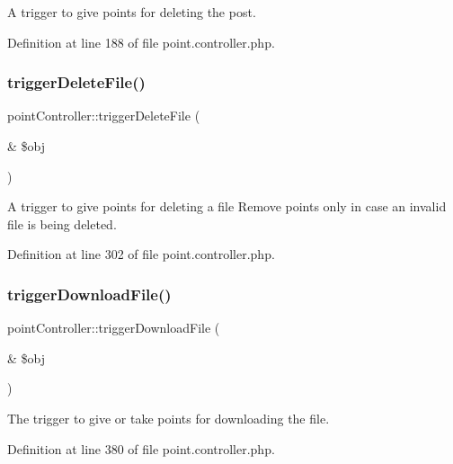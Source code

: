 A trigger to give points for deleting the post. 



Definition at line 188 of file point.\+controller.\+php.

\mbox{\label{classpointController_a1d303c7b8ada6f84e53b5d32336bc313}} 
\subsubsection{\texorpdfstring{trigger\+Delete\+File()}{triggerDeleteFile()}}
{\footnotesize\ttfamily point\+Controller\+::trigger\+Delete\+File (\begin{DoxyParamCaption}\item[{\&}]{\$obj }\end{DoxyParamCaption})}



A trigger to give points for deleting a file Remove points only in case an invalid file is being deleted. 



Definition at line 302 of file point.\+controller.\+php.

\mbox{\label{classpointController_ab6a0e04cef3ea03a427a505ed829c027}} 
\subsubsection{\texorpdfstring{trigger\+Download\+File()}{triggerDownloadFile()}}
{\footnotesize\ttfamily point\+Controller\+::trigger\+Download\+File (\begin{DoxyParamCaption}\item[{\&}]{\$obj }\end{DoxyParamCaption})}



The trigger to give or take points for downloading the file. 



Definition at line 380 of file point.\+controller.\+php.

\mbox{\label{classpointController_adfd5758c92bb06d2b77ccc3ac432f0c1}} 

